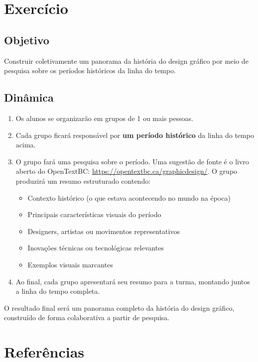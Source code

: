 \documentclass[a4paper,12pt]{article}
\begin{document}
\section{Exercício}

\subsection*{Objetivo}
Construir coletivamente um panorama da história do design gráfico por meio de pesquisa sobre os períodos históricos da linha do tempo.

\subsection*{Dinâmica}
\begin{enumerate}[nosep]
  \item Os alunos se organizarão em grupos de 1 ou mais pessoas.
  \item Cada grupo ficará responsável por \textbf{um período histórico} da linha do tempo acima.
  \item O grupo fará uma pesquisa sobre o período. Uma sugestão de fonte é o livro aberto do OpenTextBC: \url{https://opentextbc.ca/graphicdesign/}. O grupo produzirá um resumo estruturado contendo:
  \begin{itemize}[nosep]
    \item Contexto histórico (o que estava acontecendo no mundo na época)
    \item Principais características visuais do período
    \item Designers, artistas ou movimentos representativos
    \item Inovações técnicas ou tecnológicas relevantes
    \item Exemplos visuais marcantes
  \end{itemize}
  \item Ao final, cada grupo apresentará seu resumo para a turma, montando juntos a linha do tempo completa.
\end{enumerate}

\bigskip
\noindent O resultado final será um panorama completo da história do design gráfico, construído de forma colaborativa a partir de pesquisa.

\section{Referências}
\end{document}
